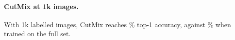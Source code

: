 \paragraph{CutMix at 1k images.}
With 1k labelled images, CutMix reaches \% top-1 accuracy, against \% when trained on the
full set.
